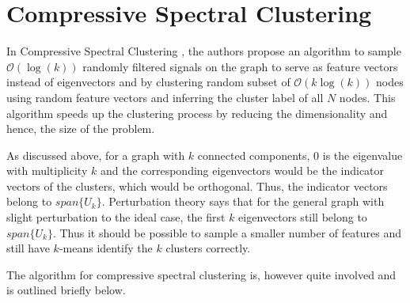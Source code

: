 \documentclass[10pt,a4paper, nocenter]{report}
\begin{document}
    \section{Compressive Spectral Clustering}
    In Compressive Spectral Clustering \cite{tremblay-compressive-SC-16}, the authors propose an algorithm to sample $\mathcal{O}(\log(k))$ randomly filtered signals on the graph to serve as feature vectors instead of eigenvectors and by clustering random subset of $\mathcal{O}(k\log(k))$ nodes using random feature vectors and inferring the cluster label of all $N$ nodes. This algorithm speeds up the clustering process by reducing the dimensionality and hence, the size of the problem.

    As discussed above, for a graph with $k$ connected components, 0 is the eigenvalue with multiplicity $k$ and the corresponding eigenvectors would be the indicator vectors of the clusters, which would be orthogonal. Thus, the indicator vectors belong to $span\{U_k\}$. Perturbation theory says that for the general graph with slight perturbation to the ideal case, the first $k$ eigenvectors still belong to $span\{U_k\}$. Thus it should be possible to sample a smaller number of features and still have $k$-means identify the $k$ clusters correctly. 

    The algorithm for compressive spectral clustering is, however quite involved and is outlined briefly below. 
\end{document}
